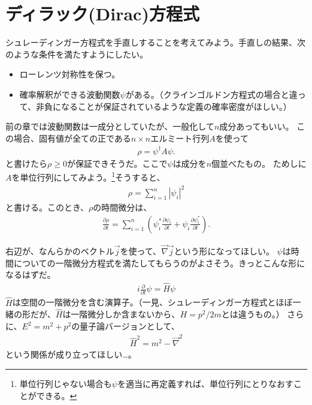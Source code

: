 \documentclass[10pt,a4paper]{jarticle}
\begin{document}
\section{ディラック(Dirac)方程式}
シュレーディンガー方程式を手直しすることを考えてみよう。手直しの結果、次のような条件を満たすようにしたい。
\begin{itemize}
\item ローレンツ対称性を保つ。
\item 確率解釈ができる波動関数$\psi$がある。（クラインゴルドン方程式の場合と違って、非負になることが保証されているような定義の確率密度がほしい。）%
\end{itemize}

前の章では波動関数は一成分としていたが、一般化して$n$成分あってもいい。
この場合、固有値が全ての正である$n\times n$エルミート行列$A$を使って
\begin{align}
\rho = \psi^\dagger A \psi.
\end{align}
と書けたら$\rho \geq 0$が保証できそうだ。ここで$\psi$は成分を$n$個並べたもの。
ためしに$A$を単位行列にしてみよう。\footnote{
単位行列じゃない場合も$\psi$を適当に再定義すれば、単位行列にとりなおすことができる。
}そうすると、
\begin{align}
\rho = \sum_{i=1}^n |\psi_i|^2
\end{align}
と書ける。このとき、$\rho$の時間微分は、
\begin{align}
\frac{\partial\rho}{\partial t} = \sum_{i=1}^n \left( \psi_i^* \frac{\partial\psi_i}{\partial t} + \psi_i \frac{\partial\psi_i^*}{\partial t} \right).
\end{align}

右辺が、なんらかのベクトル$\vec j$を使って、$\vec \nabla \vec j$という形になってほしい。
$\psi$は時間についての一階微分方程式を満たしてもらうのがよさそう。きっとこんな形になるはずだ。
\begin{align}
i\frac{\partial}{\partial t}\psi = \hat H\psi
\end{align}
$\hat H$は空間の一階微分を含む演算子。（一見、シュレーディンガー方程式とほぼ一緒の形だが、$\hat H$は一階微分しか含まないから、$H = p^2/2m$とは違うもの。）
%
さらに、$E^2 = m^2 + p^2$の量子論バージョンとして、
\begin{align}
\hat H^2 = m^2 - \vec\nabla^2 \label{eq:Hsq}
\end{align}
という関係が成り立ってほしい…。
\end{document}
